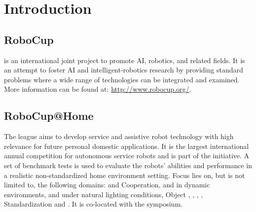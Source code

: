 \chapter{Introduction}
\label{chap:introduction}


\section{RoboCup}
\label{sec:introduction:robocup}
\RoboCup{} is an international joint project to promote AI, robotics, and related fields. It is an attempt to foster AI and intelligent-robotics research by providing standard problems where a wide range of technologies can be integrated and examined. More information can be found at:
{\small\url{http://www.robocup.org/}}.


\section{RoboCup@Home}
\label{sec:introduction:robocupathome}
The \AtHome{} league aims to develop service and assistive robot technology with high relevance for future personal domestic applications. It is the largest international annual competition for autonomous service robots and is part of the \RoboCup{} initiative. A set of benchmark tests is used to evaluate the robots' abilities and performance in a realistic non-standardized home environment setting. Focus lies on, but is not limited to, the following domains: \HRI{} and Cooperation, \NAV{} and \MAP{} in dynamic environments, \CV{} and \OR{} under natural lighting conditions, Object \MAN{}, \AB{}, \BI{}, \AmI{}, Standardization and \SysI{}. It is co-located with the \RoboCup{} symposium.











